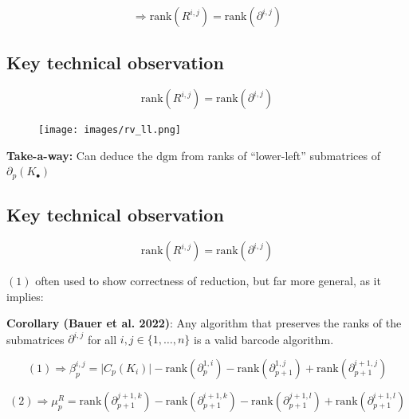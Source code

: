 \documentclass[
  letterpaper,
  DIV=11,
  numbers=noendperiod,
  oneside]{scrartcl}
\begin{document}
\[
\Rightarrow \mathrm{rank}(R^{i,j}) = \mathrm{rank}(\partial^{i,j}) 
\]

\subsection{Key technical
observation}\label{key-technical-observation-1}

\[
\mathrm{rank}(R^{i,j}) = \mathrm{rank}(\partial^{i,j}) 
\]

\begin{figure}

{\centering \texttt{[image: images/rv\_ll.png]}

}

\end{figure}

\textbf{Take-a-way:} Can deduce the \(\mathrm{dgm}\) from ranks of
``lower-left'' submatrices of \(\partial_p(K_\bullet)\)

\subsection{Key technical
observation}\label{key-technical-observation-2}

\[ 
\begin{equation}
\mathrm{rank}(R^{i,j}) = \mathrm{rank}(\partial^{i,j})  
\end{equation}
\]

\((1)\) often used to show correctness of reduction, but far more
general, as it implies:

\textbf{Corollary (Bauer et al. 2022)}: Any algorithm that preserves the
ranks of the submatrices \(\partial^{i,j}\) for all
\(i,j \in \{ 1, \dots, n \}\) is a valid barcode algorithm.

\[ 
\begin{equation}
(1) \Rightarrow \beta_p^{i,j} = \lvert C_p(K_i) \rvert - \mathrm{rank}(\partial_p^{1,i}) - \mathrm{rank}(\partial_{p+1 }^{1,j}) + \mathrm{rank}(\partial_{p+1}^{i + 1, j} ) 
\end{equation}
\]

\[ 
\begin{equation}
(2) \Rightarrow \mu_p^{R} = \mathrm{rank}(\partial_{p+1}^{j + 1, k})  - \mathrm{rank}(\partial_{p+1}^{i + 1, k})  - \mathrm{rank}(\partial_{p+1}^{j + 1, l}) + \mathrm{rank}(\partial_{p+1}^{i + 1, l})  
\end{equation}
\]

\end{document}
